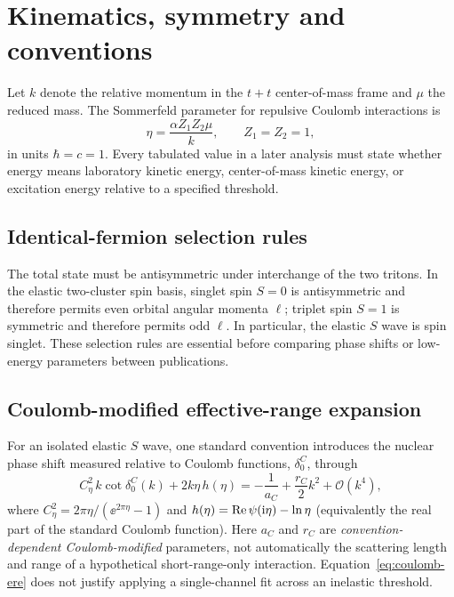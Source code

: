 \section{Kinematics, symmetry and conventions}\label{sec:tt-kinematics}
Let $k$ denote the relative momentum in the $t+t$ center-of-mass frame and $\mu$ the reduced mass. The Sommerfeld parameter for repulsive Coulomb interactions is
\begin{equation}\label{eq:sommerfeld}
\eta=\frac{\alpha Z_1Z_2\mu}{k}, \qquad Z_1=Z_2=1,
\end{equation}
in units $\hbar=c=1$. Every tabulated value in a later analysis must state whether energy means laboratory kinetic energy, center-of-mass kinetic energy, or excitation energy relative to a specified threshold.

\subsection{Identical-fermion selection rules}
The total state must be antisymmetric under interchange of the two tritons. In the elastic two-cluster spin basis, singlet spin $S=0$ is antisymmetric and therefore permits even orbital angular momenta $\ell$; triplet spin $S=1$ is symmetric and therefore permits odd $\ell$. In particular, the elastic $S$ wave is spin singlet. These selection rules are essential before comparing phase shifts or low-energy parameters between publications.

\subsection{Coulomb-modified effective-range expansion}
For an isolated elastic $S$ wave, one standard convention introduces the nuclear phase shift measured relative to Coulomb functions, $\delta_0^C$, through
\begin{equation}\label{eq:coulomb-ere}
C_\eta^2\,k\cot\delta_0^C(k)+2k\eta\,h(\eta)
=-\frac{1}{a_C}+\frac{r_C}{2}k^2+\mathcal{O}(k^4),
\end{equation}
where $C_\eta^2=2\pi\eta/(\ee^{2\pi\eta}-1)$ and $h(\eta)=\operatorname{Re}\psi(\mathrm{i}\eta)-\ln\eta$ (equivalently the real part of the standard Coulomb function). Here $a_C$ and $r_C$ are \emph{convention-dependent Coulomb-modified} parameters, not automatically the scattering length and range of a hypothetical short-range-only interaction. Equation~\eqref{eq:coulomb-ere} does not justify applying a single-channel fit across an inelastic threshold.

